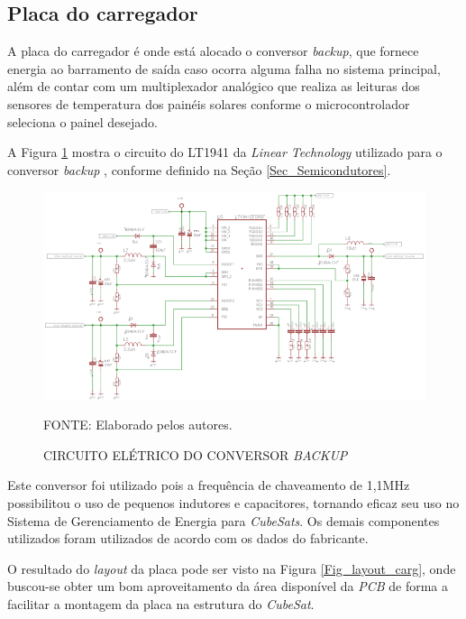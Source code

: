 \documentclass[
	12pt,				%
	openright,			%
	oneside,			%
	a4paper,			%
	english,			%
	french,				%
	spanish,			%
	brazil,				%
	oldfontcommands
	]{abntex2}
\begin{document}
\subsection[Placa do carregador]{Placa do carregador}

	A placa do carregador é onde está alocado o conversor \textit{backup}, que fornece energia ao barramento de saída caso ocorra alguma falha no sistema principal, além de contar com um multiplexador analógico que realiza as leituras dos sensores de temperatura dos painéis solares conforme o microcontrolador seleciona o painel desejado.
	
	A Figura \ref{Fig_circ_conv} mostra o circuito do LT1941 da \textit{Linear Technology} utilizado para o conversor \textit{backup} , conforme definido na Seção \ref{Sec_Semicondutores}.
	
	\begin{figure}[th]
		\caption{CIRCUITO ELÉTRICO DO CONVERSOR \textit{BACKUP}}
		\label{Fig_circ_conv}
		\centering
		\includegraphics[width=0.9\linewidth]{./figs/circ_back}
			
		\begin{small}
			FONTE: Elaborado pelos autores.
		\end{small}
	\end{figure}
	
	Este conversor foi utilizado pois a frequência de chaveamento de 1,1MHz possibilitou o uso de pequenos indutores e capacitores, tornando eficaz seu uso no Sistema de Gerenciamento de Energia para \textit{CubeSats}. Os demais componentes utilizados foram utilizados de acordo com os dados do fabricante.
	
	O resultado do \textit{layout} da placa pode ser visto na Figura \ref{Fig_layout_carg}, onde buscou-se obter um bom aproveitamento da área disponível da \textit{PCB} de forma a facilitar a montagem da placa na estrutura do \textit{CubeSat}.
	
\end{document}
